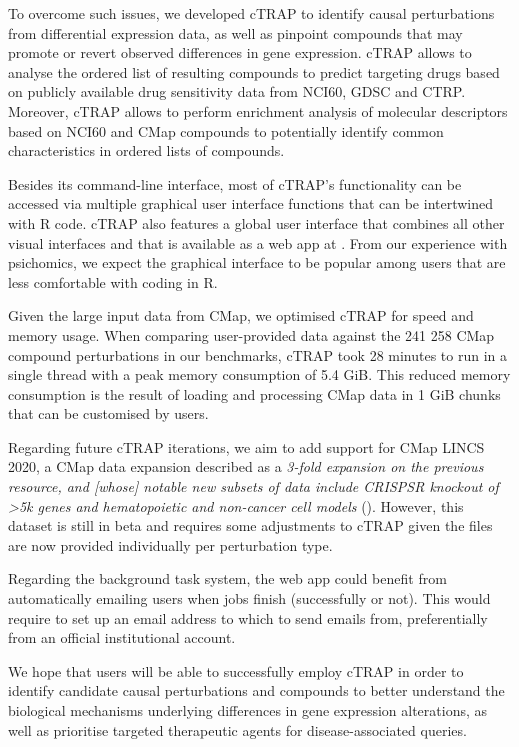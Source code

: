 To overcome such issues, we developed cTRAP to identify causal perturbations from differential expression data, as well as pinpoint compounds that may promote or revert observed differences in gene expression. cTRAP allows to analyse the ordered list of resulting compounds to predict targeting drugs based on publicly available drug sensitivity data from NCI60, GDSC and CTRP. Moreover, cTRAP allows to perform enrichment analysis of molecular descriptors based on NCI60 and CMap compounds to potentially identify common characteristics in ordered lists of compounds.

Besides its command-line interface, most of cTRAP's functionality can be accessed via multiple graphical user interface functions that can be intertwined with R code. cTRAP also features a global user interface that combines all other visual interfaces and that is available as a web app at . From our experience with psichomics, we expect the graphical interface to be popular among users that are less comfortable with coding in R.

Given the large input data from CMap, we optimised cTRAP for speed and memory usage. When comparing user-provided data against the 241 258 CMap compound perturbations in our benchmarks, cTRAP took 28 minutes to run in a single thread with a peak memory consumption of 5.4 GiB. This reduced memory consumption is the result of loading and processing CMap data in 1 GiB chunks that can be customised by users.

Regarding future cTRAP iterations, we aim to add support for CMap LINCS 2020, a CMap data expansion described as a \emph{3-fold expansion on the previous resource, and [whose] notable new subsets of data include CRISPSR knockout of \textgreater 5k genes and hematopoietic and non-cancer cell models} (). However, this dataset is still in beta and requires some adjustments to cTRAP given the files are now provided individually per perturbation type.

Regarding the background task system, the web app could benefit from automatically emailing users when jobs finish (successfully or not). This would require to set up an email address to which to send emails from, preferentially from an official institutional account.

We hope that users will be able to successfully employ cTRAP in order to identify candidate causal perturbations and compounds to better understand the biological mechanisms underlying differences in gene expression alterations, as well as prioritise targeted therapeutic agents for disease-associated queries.
